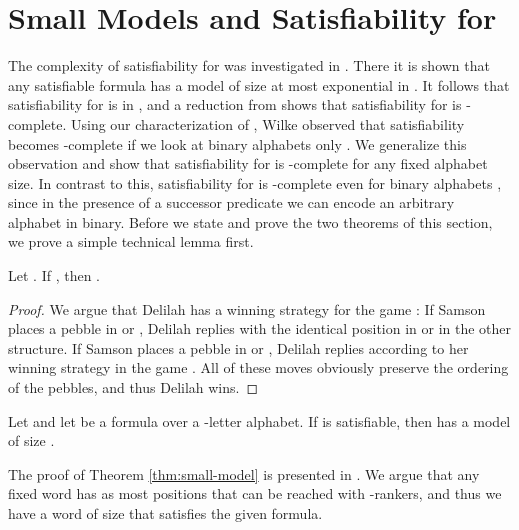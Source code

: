 \documentclass{LMCS}
\begin{document}
\section{Small Models and Satisfiability for \texorpdfstring{}{FOV2[<]}}
\label{sec:satisfiability}

\newcommand{\TILING}{\lang{TILING}}

The complexity of satisfiability for  was investigated in
\cite{EVW02}. There it is shown that any satisfiable 
formula has a model of size at most exponential in . It follows that
satisfiability for  is in \NEXP, and a reduction from \TILING{}
shows that satisfiability for  is \NEXP-complete. Using our
characterization of , Wilke
observed that satisfiability becomes -complete if we look at binary
alphabets only \cite{W07}. We generalize this observation and show that
satisfiability for  is -complete for any fixed alphabet
size. In contrast to this, satisfiability for  is
-complete even for binary alphabets \cite{EVW02}, since in the
presence of a successor predicate we can encode an arbitrary alphabet in
binary. Before we state and prove the two theorems of this section, we
prove a simple technical lemma first.

\begin{lem}
  \label{lem:equiv-word-replace}
  Let . If , then .
\end{lem}

\begin{proof}
  We argue that Delilah has a winning strategy for the game
  : If Samson places a pebble in  or , Delilah
  replies with the identical position in  or  in the other structure.
  If Samson places a pebble in  or , Delilah replies according to her
  winning strategy in the game . All of these moves
  obviously preserve the ordering of the pebbles, and thus Delilah wins.
\end{proof}


\begin{thm}
  \label{thm:small-model}
  Let  and let  be a formula over a -letter alphabet. If  is
  satisfiable, then  has a model of size .
\end{thm}

\begin{conference}
  The proof of Theorem \ref{thm:small-model} is presented in \cite{WI07}. We
  argue that any fixed word has as most  positions that can be
  reached with -rankers, and thus we have a word of size  that
  satisfies the given formula.
\end{conference}
\end{document}
